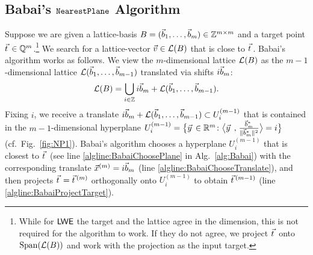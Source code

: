 \subsection{Babai's $\texttt{NearestPlane}$ Algorithm} \label{sec:BabaisNP}

Suppose we are given a lattice-basis $B = (\vec b_1, \ldots, \vec b_m) \in {{\mathbb Z}}^{m \times m}$ and a target point $\tvec \in \Q^m$.\footnote{While for $\textsf{LWE}$ the target and the lattice agree in the dimension, this is not required for the algorithm to work. If they do not agree, we project $\tvec$ onto $\operatorname{Span}(\mathcal{L}(B))$  and work with the projection as the input target.} 
We search for a lattice-vector $\vvec \in \Lat(\BMat)$ that is close to $\tvec$.
Babai's algorithm works as follows. We view the $m$-dimensional lattice $\mathcal{L}(B)$ as the $m-1$-dimensional lattice $\mathcal{L}(\vec b_1, \ldots, \vec b_{m-1})$ translated via shifts $i \vec b_m$:
\[
 \mathcal{L}(B) = \bigcup_{i \in {{\mathbb Z}}} i \vec b_m + \mathcal{L}(\vec b_1, \ldots, \vec b_{m-1}).
\]
Fixing $i$, we receive a translate $i \vec b_m + \mathcal{L}(\vec b_1, \ldots, \vec b_{m-1}) \subset U_i^{(m-1)}$ that is contained in the $m-1$-dimensional hyperplane $U_i^{(m-1)} = \bigl\{\yvec \in \R^m \colon \bigScProd{\yvec}{\frac{\wbvec_m}{\| \wbvec_m \|^2}} = i \bigr\}$ (cf.\ Fig.~\ref{fig:NP1}).
Babai's algorithm chooses a hyperplane $U_i^{(m-1)}$ that is closest to $\tvec$ (see line \ref{algline:BabaiChoosePlane} in Alg.~\ref{alg:Babai}) with the corresponding translate $\vec x^{(m)} = i \vec b_m$ (line \ref{algline:BabaiChooseTranslate}), and then projects $\tvec = \tvec^{(m)}$ orthogonally onto $U_i^{(m-1)}$ to obtain $\tvec^{(m-1)}$ (line \ref{algline:BabaiProjectTarget}). 

